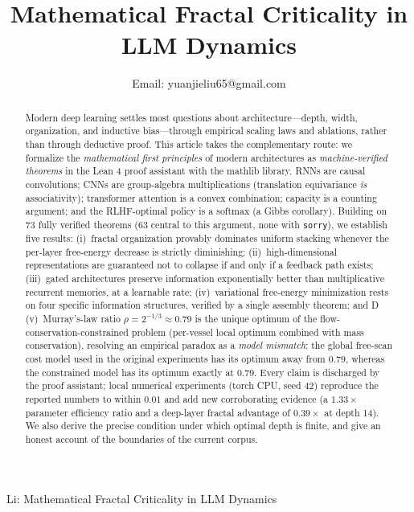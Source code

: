 \documentclass[journal]{IEEEtran}
\begin{document}
\title{Mathematical Fractal Criticality in LLM Dynamics}

\author{Email: yuanjieliu65@gmail.com}

%
{Li: Mathematical Fractal Criticality in LLM Dynamics}

\maketitle

\begin{abstract}
Modern deep learning settles most questions about architecture---depth, width,
organization, and inductive bias---through empirical scaling laws and ablations,
rather than through deductive proof. This article takes the complementary route:
we formalize the \emph{mathematical first principles} of modern architectures
as \emph{machine-verified theorems} in the Lean 4 proof assistant with the
mathlib library. RNNs are causal convolutions; CNNs are group-algebra
multiplications (translation equivariance \emph{is} associativity); transformer
attention is a convex combination; capacity is a counting argument; and the
RLHF-optimal policy is a softmax (a Gibbs corollary). Building on 73 fully
verified theorems (63 central to this argument, none with \texttt{sorry}), we
establish five results: (i)~fractal organization provably dominates uniform
stacking whenever the per-layer free-energy decrease is strictly diminishing;
(ii)~high-dimensional representations are guaranteed not to collapse if and
only if a feedback path exists; (iii)~gated architectures preserve information
exponentially better than multiplicative recurrent memories, at a learnable
rate; (iv)~variational free-energy minimization rests on four specific
information structures, verified by a single assembly theorem; and
D
(v)~Murray's-law ratio $\rho=2^{-1/3}\approx0.79$ is the unique optimum of the
flow-conservation-constrained problem (per-vessel local optimum combined with
mass conservation), resolving an empirical paradox as a \emph{model mismatch}:
the global free-scan cost model used in the original experiments has its
optimum away from $0.79$, whereas the constrained model has its optimum
exactly at $0.79$. Every claim is discharged by the proof assistant; local
numerical experiments (torch CPU, seed 42) reproduce the reported numbers to
within $0.01$ and add new corroborating evidence (a $1.33\times$ parameter
efficiency ratio and a deep-layer fractal advantage of $0.39\times$ at depth
14). We also derive the precise condition under which
optimal depth is finite, and give an honest account of the boundaries of the
current corpus.
\end{abstract}
\end{document}
